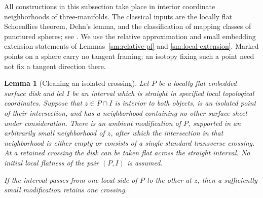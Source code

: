 \documentclass[11pt]{article}
\numberwithin{equation}{section}
\newtheorem{lemma}[theorem]{Lemma}
\theoremstyle{definition}
\theoremstyle{remark}
\begin{document}
All constructions in this subsection take place in interior coordinate
neighborhoods of three-manifolds. The classical inputs are the locally
flat Schoenflies theorem, Dehn's lemma, and the classification of
mapping classes of punctured spheres; see
\cite{Brown1960,Brown1962,Papakyriakopoulos1957,FarbMargalit2012}.
We use the relative approximation and small embedding extension
statements of Lemmas~\ref{sm:relative-pl} and
\ref{sm:local-extension}. Marked points on a sphere carry no tangent
framing; an isotopy fixing such a point need not fix a tangent
direction there.

\begin{lemma}[Cleaning an isolated crossing]\label{lt:clean-crossing}
Let $P$ be a locally flat embedded surface disk and let $I$ be an interval
which is straight in specified local topological coordinates.  Suppose
that $z\in P\cap I$ is interior to both objects, is an isolated point of
their intersection, and has a neighborhood containing no other surface
sheet under consideration.  There is an ambient modification of $P$,
supported in an arbitrarily small neighborhood of $z$, after which the
intersection in that neighborhood is either empty or consists of a
single standard transverse crossing.  At a retained crossing the disk
can be taken flat across the straight interval.  No initial local
flatness of the pair $(P,I)$ is assumed.

If the interval passes from one local side of $P$ to the other at $z$,
then a sufficiently small modification retains one crossing.
\end{lemma}
\end{document}
